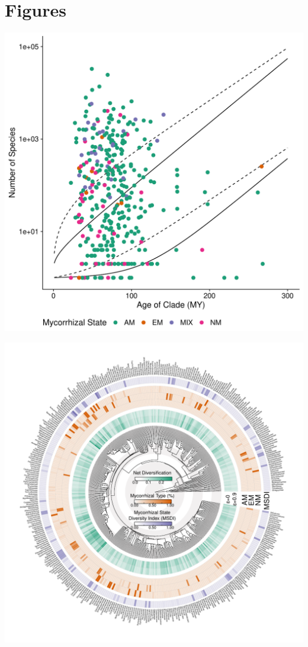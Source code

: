 \documentclass[12pt,]{article}
\begin{document}
\newpage

\hypertarget{figures}{%
\section{Figures}\label{figures}}

\includegraphics{../output/figs/magsand_stem_nolabel.pdf}

\newpage

\includegraphics{../output/tree_fig/phylo_genus_final_resized.pdf}
\end{document}
